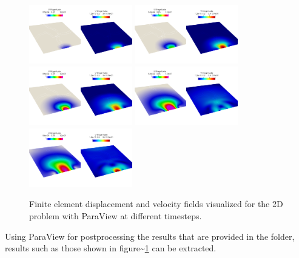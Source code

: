 \begin{figure}[h!]
\centering
\includegraphics[width=0.4\textwidth]{./Images/sd-u0.png}
\includegraphics[width=0.4\textwidth]{./Images/sd-u1.png}\\
\includegraphics[width=0.4\textwidth]{./Images/sd-u2.png}
\includegraphics[width=0.4\textwidth]{./Images/sd-u3.png}\\
\includegraphics[width=0.4\textwidth]{./Images/sd-u4.png}
\caption{Finite element displacement and velocity fields visualized for the 2D problem with ParaView at different timesteps. \label{bar-sd}}
\end{figure}

Using ParaView for postprocessing the results that are provided in the
 folder, results such as those shown in
figure\textasciitilde{}\ref{bar-sd} can be extracted.
